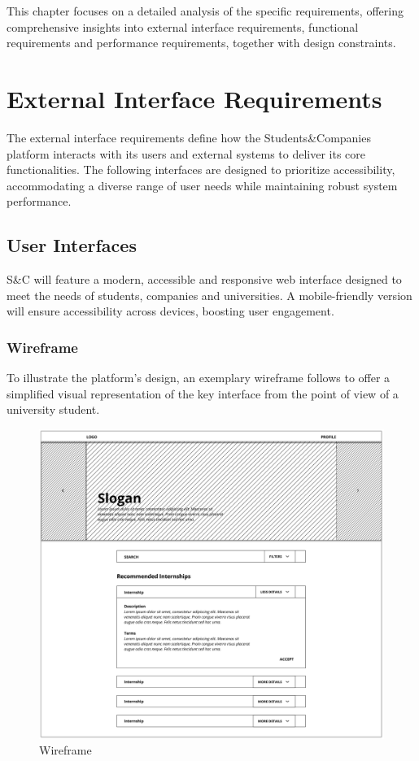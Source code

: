 This chapter focuses on a detailed analysis of the specific requirements, offering comprehensive insights into external interface requirements, functional requirements and performance requirements, together with design constraints.

\section{External Interface Requirements}
The external interface requirements define how the Students\&Companies platform interacts with its users and external systems to deliver its core functionalities.
The following interfaces are designed to prioritize accessibility, accommodating a diverse range of user needs while maintaining robust system performance.

\subsection{User Interfaces}
S\&C will feature a modern, accessible and responsive web interface designed to meet the needs of students, companies and universities.
A mobile-friendly version will ensure accessibility across devices, boosting user engagement.

\subsubsection{Wireframe}
To illustrate the platform’s design, an exemplary wireframe follows to offer a simplified visual representation of the key interface from the point of view of a university student.

\begin{figure}
    \centering
    \includegraphics[width=16cm]{images/wireframe.png}
    \caption{Wireframe}
\end{figure}

